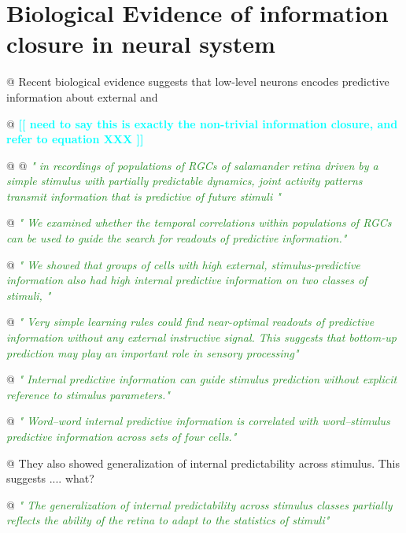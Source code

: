 \documentclass[utf8]{article}
\newenvironment{ants}
			{
			 \begin{easylist}[itemize]
			}
			{
			\end{easylist}
			}
\newcommand{\rewrite}[1]{\textcolor{ForestGreen}{\textit{"#1"}}\newline}
\newcommand{\toWrite}[1]{\noindent
			\textcolor{Cyan}{\textbf{[[ #1 ]]}}}
\begin{document}
		
	\section{Biological Evidence of information closure in neural system}
		
		\begin{ants}		
			
			@ Recent biological evidence suggests that low-level neurons encodes predictive information about external  and 
			
			@ \toWrite{
				need to say this is exactly the non-trivial information closure, and refer to equation XXX}
			
			@ \cite{sederberg2018learning}
			@ \rewrite{
				in recordings of populations of RGCs of salamander retina driven by a simple stimulus with partially predictable dynamics, joint activity patterns transmit information that is predictive of future stimuli }
			
			@ \rewrite{
				We examined whether the temporal correlations within populations of RGCs can be used to guide the search for readouts of predictive information.}
			
			@ \rewrite{
				We showed that groups of cells with high external, stimulus-predictive information also had high internal predictive information on two classes of stimuli, }
			
			@ \rewrite{
				Very simple learning rules could find near-optimal readouts of predictive information without any external instructive signal. This suggests that bottom-up prediction may play an important role in sensory processing}
			
			@ \rewrite{
				Internal predictive information can guide stimulus prediction without explicit reference to stimulus parameters.}
			
			@ \rewrite{
				Word–word internal predictive information is correlated with word–stimulus predictive information across sets of four cells.}
			
			@ They also showed generalization of internal predictability across stimulus. This suggests .... what?
			
			@ \rewrite{
				The generalization of internal predictability across stimulus classes partially reflects the ability of the retina to adapt to the statistics of stimuli}
			

\end{ants}
\end{document}
